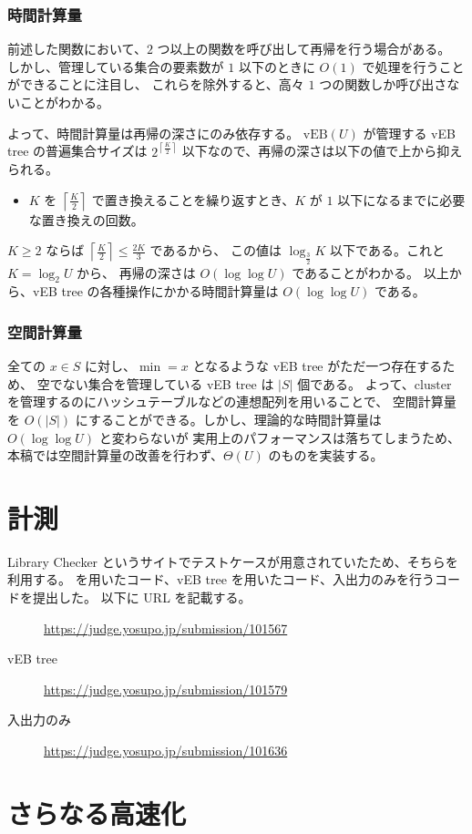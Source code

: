 \documentclass[dvipdfmx,a4j,10pt]{jarticle}
\begin{document}
\subsubsection{時間計算量}

前述した関数において、$2$ つ以上の関数を呼び出して再帰を行う場合がある。
しかし、管理している集合の要素数が $1$ 以下のときに $O(1)$ で処理を行うことができることに注目し、
これらを除外すると、高々 $1$ つの関数しか呼び出さないことがわかる。

よって、時間計算量は再帰の深さにのみ依存する。
$\mathrm{vEB}(U)$ が管理する vEB tree の普遍集合サイズは $2^{\left\lceil \frac{K}{2} \right\rceil}$ 以下なので、再帰の深さは以下の値で上から抑えられる。

\begin{itemize}
  \item $K$ を $\left\lceil \frac{K}{2} \right\rceil$ で置き換えることを繰り返すとき、$K$ が $1$ 以下になるまでに必要な置き換えの回数。
\end{itemize}

$K \geq 2$ ならば $\left\lceil \frac{K}{2} \right\rceil \leq \frac{2K}{3}$ であるから、
この値は $\log_{\frac{3}{2}}{K}$ 以下である。これと $K = \log_2{U}$ から、
再帰の深さは $O(\log \log U)$ であることがわかる。
以上から、vEB tree の各種操作にかかる時間計算量は $O(\log \log U)$ である。

\subsubsection{空間計算量}

全ての $x \in S$ に対し、$\min = x$ となるような vEB tree がただ一つ存在するため、
空でない集合を管理している vEB tree は $|S|$ 個である。
よって、$\mathrm{cluster}$ を管理するのにハッシュテーブルなどの連想配列を用いることで、
空間計算量を $O(|S|)$ にすることができる。しかし、理論的な時間計算量は $O(\log \log U)$ と変わらないが
実用上のパフォーマンスは落ちてしまうため、本稿では空間計算量の改善を行わず、$\Theta(U)$ のものを実装する。

\section{計測}

Library Checker というサイトでテストケースが用意されていたため、そちらを利用する。
 を用いたコード、vEB tree を用いたコード、入出力のみを行うコードを提出した。
以下に URL を記載する。

\begin{description}
  \item[] \url{https://judge.yosupo.jp/submission/101567}
  \item[vEB tree] \url{https://judge.yosupo.jp/submission/101579}
  \item[入出力のみ] \url{https://judge.yosupo.jp/submission/101636}
\end{description}



\section{さらなる高速化}
\end{document}
